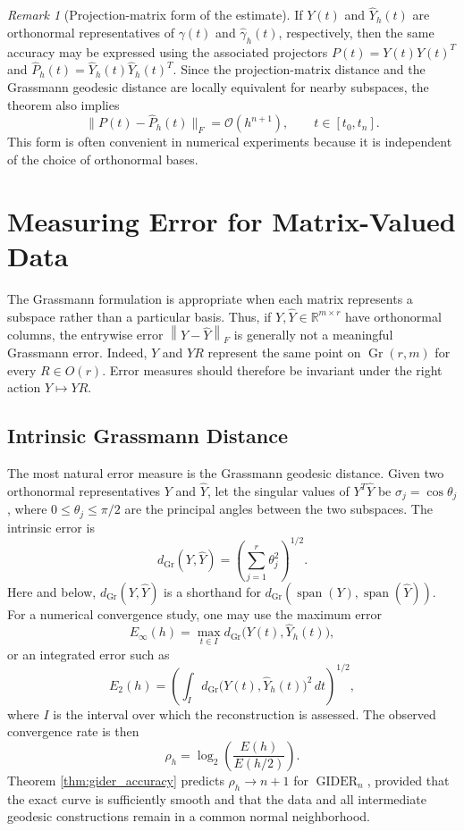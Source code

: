 \documentclass[a4paper,11pt]{article}
\newcommand{\bR}{\mathbb{R}}
\DeclareMathOperator{\Gr}{Gr}
\DeclareMathOperator{\spanop}{span}
\newcommand{\norm}[1]{\left\lVert #1 \right\rVert}
\newcommand{\GIDER}{\operatorname{GIDER}}
\numberwithin{equation}{section}
\theoremstyle{plain}
\theoremstyle{definition}
\theoremstyle{remark}
\newtheorem{remark}[thm]{Remark}
\begin{document}
\begin{remark}[Projection-matrix form of the estimate]\label{rem:projection_accuracy}
If \(Y(t)\) and \(\widehat Y_h(t)\) are orthonormal representatives of \(\gamma(t)\) and \(\widehat{\gamma}_h(t)\), respectively, then the same accuracy may be expressed using the associated projectors \(P(t)=Y(t)Y(t)^T\) and \(\widehat P_h(t)=\widehat Y_h(t)\widehat Y_h(t)^T\).  Since the projection-matrix distance and the Grassmann geodesic distance are locally equivalent for nearby subspaces, the theorem also implies
\[
    \|P(t)-\widehat P_h(t)\|_F
    =
    \mathcal{O}(h^{n+1}),
    \qquad t\in[t_0,t_n].
\]
This form is often convenient in numerical experiments because it is independent of the choice of orthonormal bases.
\end{remark}

%

\section{Measuring Error for Matrix-Valued Data}\label{sec:error}

The Grassmann formulation is appropriate when each matrix represents a subspace rather than a particular basis.  Thus, if \(Y,\widehat Y\in\bR^{m\times r}\) have orthonormal columns, the entrywise error \(\norm{Y-\widehat Y}_F\) is generally not a meaningful Grassmann error.  Indeed, \(Y\) and \(YR\) represent the same point on \(\Gr(r,m)\) for every \(R\in O(r)\).  Error measures should therefore be invariant under the right action \(Y\mapsto YR\).

\subsection{Intrinsic Grassmann Distance}

The most natural error measure is the Grassmann geodesic distance.  Given two orthonormal representatives \(Y\) and \(\widehat Y\), let the singular values of \(Y^T\widehat Y\) be \(\sigma_j=\cos\theta_j\), where \(0\le \theta_j\le \pi/2\) are the principal angles between the two subspaces.  The intrinsic error is
\[
    d_{\Gr}(Y,\widehat Y)
    =
    \left(\sum_{j=1}^r\theta_j^2\right)^{1/2}.
\]
Here and below, \(d_{\Gr}(Y,\widehat Y)\) is a shorthand for \(d_{\Gr}(\spanop(Y),\spanop(\widehat Y))\).  For a numerical convergence study, one may use the maximum error
\[
    E_\infty(h)
    =
    \max_{t\in I} d_{\Gr}\bigl(Y(t),\widehat Y_h(t)\bigr),
\]
or an integrated error such as
\[
    E_2(h)
    =
    \left(
        \int_I d_{\Gr}\bigl(Y(t),\widehat Y_h(t)\bigr)^2\,dt
    \right)^{1/2},
\]
where \(I\) is the interval over which the reconstruction is assessed.  The observed convergence rate is then
\[
    \rho_h
    =
    \log_2\left(\frac{E(h)}{E(h/2)}\right).
\]
Theorem \ref{thm:gider_accuracy} predicts \(\rho_h\to n+1\) for \(\GIDER_n\), provided that the exact curve is sufficiently smooth and that the data and all intermediate geodesic constructions remain in a common normal neighborhood.
\end{document}
